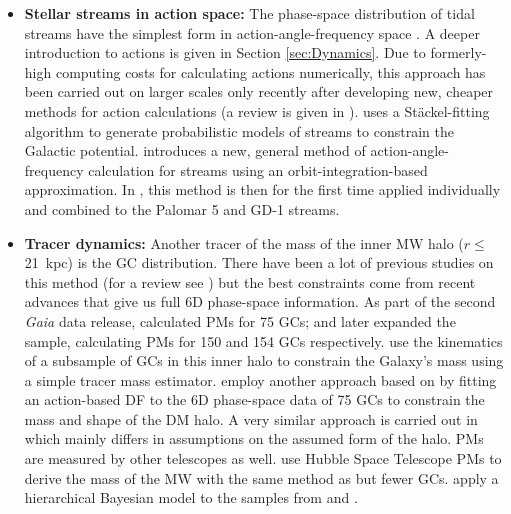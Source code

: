\begin{itemize}
    \item \textbf{Stellar streams in action space:} The phase-space distribution of tidal streams have the simplest form in action-angle-frequency space \citep{Tremaine...streamsactiontheory...1999, Helmi...streamsactionstheory...1999}. A deeper introduction to actions is given in Section \ref{sec:Dynamics}. Due to formerly-high computing costs for calculating actions numerically, this approach has been carried out on larger scales only recently after developing new, cheaper methods for action calculations (a review is given in \citealp{Sanders...actionreview...2016}). \citet{Streams...Sanders...2014} uses a St\"ackel-fitting algorithm \citep{Sanders...Staeckel...2012} to generate probabilistic models of streams to constrain the Galactic potential. \citet{Streams...Bovy...2014} introduces a new, general method of action-angle-frequency calculation for streams using an orbit-integration-based approximation. In \citet{Streams..GD1..Pal5...Bovy...2016}, this method is then for the first time applied individually and combined to the Palomar 5 and GD-1 streams.
    \item \textbf{Tracer dynamics:} Another tracer of the mass of the inner \ac{MW} halo ($r\le$ \SI{21}{kpc}) is the \ac{GC} distribution. There have been a lot of previous studies on this method (for a review see \citealp{Bland-Hawthorn...MW...2016}) but the best constraints come from recent advances that give us full 6D phase-space information. As part of the second \textit{Gaia} data release, \citet{GaiaDR...GCs...2018} calculated \acp{PM} for 75 \acp{GC}; \citet{Vasiliev...GCoverview...2018} and \citet{Baumgardt...GCoverview...2019} later expanded the sample, calculating \acp{PM} for 150 and 154 \acp{GC} respectively. \citet{MWmass...GCmotions...Watkins...2018} use the kinematics of a subsample of \acp{GC} in this inner halo to constrain the Galaxy's mass using a simple tracer mass estimator. \citet{Posti...MWmassGCs...2019} employ another approach based on \citet{Binney...MWGCModel....2017} by fitting an action-based \ac{DF} to the 6D phase-space data of 75 \acp{GC} to constrain the mass and shape of the \ac{DM} halo. A very similar approach is carried out in \citet{Vasiliev...GCoverview...2018} which mainly differs in assumptions on the assumed form of the halo. \acp{PM} are measured by other telescopes as well. \citet{Sohn...GCsHST..2018} use Hubble Space Telescope \acp{PM} to derive the mass of the \ac{MW} with the same method as \citet{MWmass...GCmotions...Watkins...2018} but fewer \acp{GC}. \citet{Eadie...GCsBayes...2018} apply a hierarchical Bayesian model to the samples from \citet{Vasiliev...GCoverview...2018} and \citet{Sohn...GCsHST..2018}.

\end{itemize}
